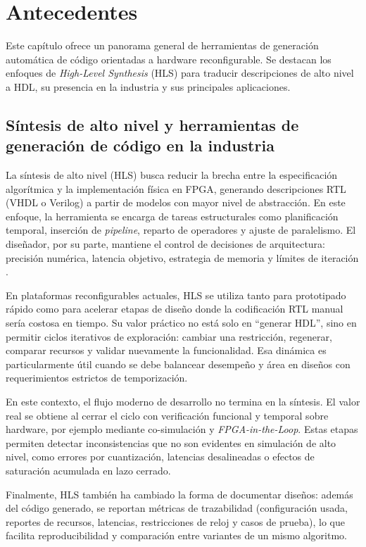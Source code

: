 \chapter{Antecedentes}

Este capítulo ofrece un panorama general de herramientas de generación automática de código orientadas a hardware reconfigurable. Se destacan los enfoques de \textit{High-Level Synthesis} (HLS) para traducir descripciones de alto nivel a HDL, su presencia en la industria y sus principales aplicaciones.

\section{Síntesis de alto nivel y herramientas de generación de código en la industria}

La síntesis de alto nivel (HLS) busca reducir la brecha entre la especificación algorítmica y la implementación física en FPGA, generando descripciones RTL (VHDL o Verilog) a partir de modelos con mayor nivel de abstracción. En este enfoque, la herramienta se encarga de tareas estructurales como planificación temporal, inserción de \textit{pipeline}, reparto de operadores y ajuste de paralelismo. El diseñador, por su parte, mantiene el control de decisiones de arquitectura: precisión numérica, latencia objetivo, estrategia de memoria y límites de iteración \cite{coussy2009high,gaide2011high}.

En plataformas reconfigurables actuales, HLS se utiliza tanto para prototipado rápido como para acelerar etapas de diseño donde la codificación RTL manual sería costosa en tiempo. Su valor práctico no está solo en ``generar HDL'', sino en permitir ciclos iterativos de exploración: cambiar una restricción, regenerar, comparar recursos y validar nuevamente la funcionalidad. Esa dinámica es particularmente útil cuando se debe balancear desempeño y área en diseños con requerimientos estrictos de temporización.

En este contexto, el flujo moderno de desarrollo no termina en la síntesis. El valor real se obtiene al cerrar el ciclo con verificación funcional y temporal sobre hardware, por ejemplo mediante co-simulación y \textit{FPGA-in-the-Loop}. Estas etapas permiten detectar inconsistencias que no son evidentes en simulación de alto nivel, como errores por cuantización, latencias desalineadas o efectos de saturación acumulada en lazo cerrado.

Finalmente, HLS también ha cambiado la forma de documentar diseños: además del código generado, se reportan métricas de trazabilidad (configuración usada, reportes de recursos, latencias, restricciones de reloj y casos de prueba), lo que facilita reproducibilidad y comparación entre variantes de un mismo algoritmo.

